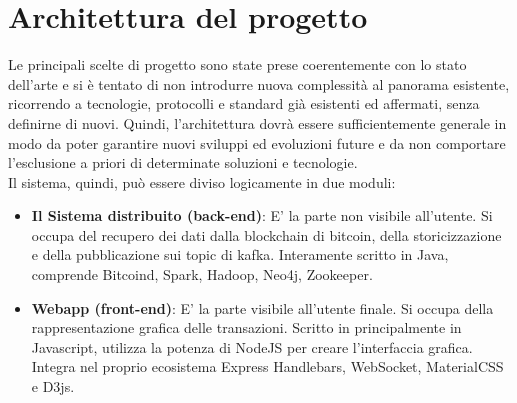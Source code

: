 \section{Architettura  del progetto}
\label{sec:architettura del progetto}
Le principali scelte di progetto sono state prese coerentemente con lo stato dell’arte e si è tentato di non introdurre nuova complessità al panorama esistente, ricorrendo a tecnologie, protocolli e standard già esistenti ed affermati, senza definirne di nuovi. Quindi, l’architettura dovrà essere sufficientemente generale in modo da poter garantire nuovi sviluppi ed evoluzioni future e da non comportare l’esclusione a priori di determinate soluzioni e tecnologie. 
\\Il sistema, quindi, può essere diviso logicamente in due moduli:
\begin{itemize}
	\item \textbf{Il Sistema distribuito (back-end)}: E' la parte non visibile all'utente. Si occupa del recupero dei dati dalla blockchain di bitcoin, della storicizzazione e della pubblicazione sui topic di kafka. Interamente scritto in Java, comprende Bitcoind, Spark, Hadoop, Neo4j, Zookeeper.
	\item \textbf{Webapp (front-end)}: E' la parte visibile all'utente finale. Si occupa della rappresentazione grafica delle transazioni. Scritto in principalmente in Javascript, utilizza la potenza di NodeJS per creare l'interfaccia grafica. Integra nel proprio ecosistema Express Handlebars, WebSocket, MaterialCSS e D3js.
\end{itemize} 

